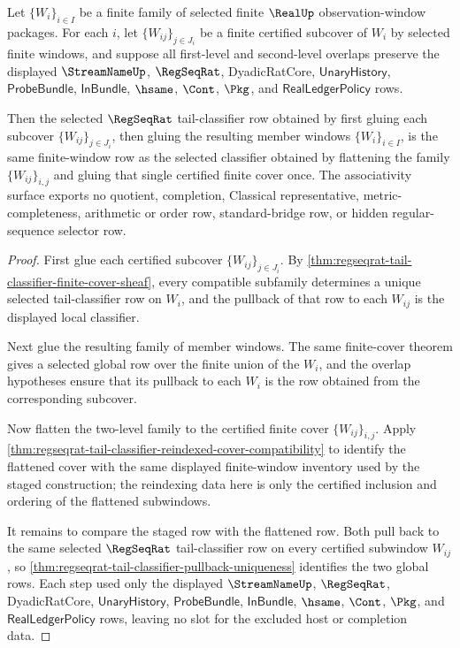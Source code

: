 \begin{theorem}
\label{thm:regseqrat-tail-classifier-nested-cover-associativity}
Let $\{W_i\}_{i\in I}$ be a finite family of selected finite $\RealUp$
observation-window packages. For each $i$, let $\{W_{ij}\}_{j\in J_i}$ be a
finite certified subcover of $W_i$ by selected finite windows, and suppose
all first-level and second-level overlaps preserve the displayed
$\StreamNameUp$, $\RegSeqRat$, DyadicRatCore, $\mathsf{UnaryHistory}$,
$\mathsf{ProbeBundle}$, $\mathsf{InBundle}$, $\hsame$, $\Cont$, $\Pkg$, and
$\mathsf{RealLedgerPolicy}$ rows.

Then the selected $\RegSeqRat$ tail-classifier row obtained by first gluing
each subcover $\{W_{ij}\}_{j\in J_i}$, then gluing the resulting member
windows $\{W_i\}_{i\in I}$, is the same finite-window row as the selected
classifier obtained by flattening the family $\{W_{ij}\}_{i,j}$ and gluing
that single certified finite cover once. The associativity surface exports no
quotient, completion, Classical representative, metric-completeness,
arithmetic or order row, standard-bridge row, or hidden regular-sequence
selector row.
\end{theorem}
\begin{proof}
First glue each certified subcover $\{W_{ij}\}_{j\in J_i}$. By
\autoref{thm:regseqrat-tail-classifier-finite-cover-sheaf}, every compatible
subfamily determines a unique selected tail-classifier row on $W_i$, and the
pullback of that row to each $W_{ij}$ is the displayed local classifier.

Next glue the resulting family of member windows. The same finite-cover
theorem gives a selected global row over the finite union of the $W_i$, and
the overlap hypotheses ensure that its pullback to each $W_i$ is the row
obtained from the corresponding subcover.

Now flatten the two-level family to the certified finite cover
$\{W_{ij}\}_{i,j}$. Apply
\autoref{thm:regseqrat-tail-classifier-reindexed-cover-compatibility} to
identify the flattened cover with the same displayed finite-window inventory
used by the staged construction; the reindexing data here is only the
certified inclusion and ordering of the flattened subwindows.

It remains to compare the staged row with the flattened row. Both pull back
to the same selected $\RegSeqRat$ tail-classifier row on every certified
subwindow $W_{ij}$, so
\autoref{thm:regseqrat-tail-classifier-pullback-uniqueness} identifies the
two global rows. Each step used only the displayed $\StreamNameUp$,
$\RegSeqRat$, DyadicRatCore, $\mathsf{UnaryHistory}$,
$\mathsf{ProbeBundle}$, $\mathsf{InBundle}$, $\hsame$, $\Cont$, $\Pkg$, and
$\mathsf{RealLedgerPolicy}$ rows, leaving no slot for the excluded host or
completion data.
\end{proof}

